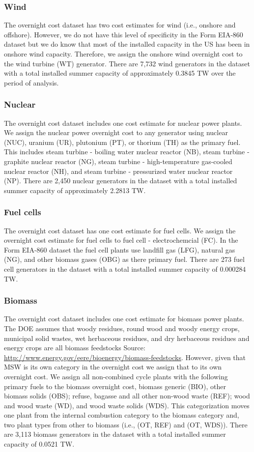\documentclass[10pt]{report}
\begin{document}
\subsubsection{Wind}
The overnight cost dataset has two cost estimates for wind (i.e., onshore and offshore).
However, we do not have this level of specificity in the Form EIA-860 dataset but we do know that most of the installed capacity in the US has been in onshore wind capacity. 
Therefore, we assign the onshore wind overnight cost to the wind turbine (WT) generator. 
There are 7,732 wind generators in the dataset with a total installed summer capacity of approximately 0.3845 TW over the period of analysis. 

\subsubsection{Nuclear}
The overnight cost dataset includes one cost estimate for nuclear power plants.
We assign the nuclear power overnight cost to any generator using nuclear (NUC), uranium (UR), plutonium (PT), or thorium (TH) as the primary fuel.  
This includes steam turbine - boiling water nuclear reactor (NB), steam turbine - graphite nuclear reactor (NG), steam turbine - high-temperature gas-cooled nuclear reactor (NH), and steam turbine - pressurized water nuclear reactor (NP).
There are 2,450 nuclear generators in the dataset with a total installed summer capacity of approximately 2.2813 TW.

\subsubsection{Fuel cells}
The overnight cost dataset has one cost estimate for fuel cells.
We assign the overnight cost estimate for fuel cells to fuel cell - electrochemcial (FC). 
In the Form EIA-860 dataset the fuel cell plants use landfill gas (LFG), natural gas (NG), and other biomass gases (OBG) as there primary fuel. 
There are 273 fuel cell generators in the dataset with a total installed summer capacity of 0.000284 TW.

\subsubsection{Biomass}
The overnight cost dataset includes one cost estimate for biomass power plants. 
The DOE assumes that woody residues, round wood and woody energy crops, municipal solid wastes, wet herbaceous residues, and dry herbaceous residues and energy crops are all biomass feedstocks Source: \url{http://www.energy.gov/eere/bioenergy/biomass-feedstocks}. 
However, given that MSW is its own category in the overnight cost we assign that to its own overnight cost.
We assign all non-combined cycle plants with the following primary fuels to the biomass overnight cost, biomass generic (BIO), other biomass solids (OBS); refuse, bagasse and all other non-wood waste (REF); wood and wood waste (WD), and wood waste solids (WDS). 
This categorization moves one plant from the internal combustion category to the biomass category and, two plant types from other to biomass (i.e., (OT, REF) and (OT, WDS)). 
There are 3,113 biomass generators in the dataset with a total installed summer capacity of 0.0521 TW. 
\end{document}
